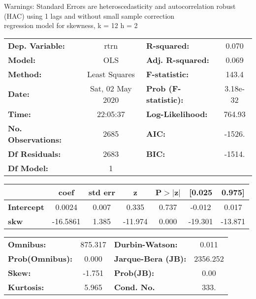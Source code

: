 Warnings: \newline
 [1] Standard Errors are heteroscedasticity and autocorrelation robust (HAC) using 1 lags and without small sample correction\\ 

regression model for skewness, k = 12 h = 2\begin{center}
\begin{tabular}{lclc}
\toprule
\textbf{Dep. Variable:}    &       rtrn       & \textbf{  R-squared:         } &     0.070   \\
\textbf{Model:}            &       OLS        & \textbf{  Adj. R-squared:    } &     0.069   \\
\textbf{Method:}           &  Least Squares   & \textbf{  F-statistic:       } &     143.4   \\
\textbf{Date:}             & Sat, 02 May 2020 & \textbf{  Prob (F-statistic):} &  3.18e-32   \\
\textbf{Time:}             &     22:05:37     & \textbf{  Log-Likelihood:    } &    764.93   \\
\textbf{No. Observations:} &        2685      & \textbf{  AIC:               } &    -1526.   \\
\textbf{Df Residuals:}     &        2683      & \textbf{  BIC:               } &    -1514.   \\
\textbf{Df Model:}         &           1      & \textbf{                     } &             \\
\bottomrule
\end{tabular}
\begin{tabular}{lcccccc}
                   & \textbf{coef} & \textbf{std err} & \textbf{z} & \textbf{P$> |$z$|$} & \textbf{[0.025} & \textbf{0.975]}  \\
\midrule
\textbf{Intercept} &       0.0024  &        0.007     &     0.335  &         0.737        &       -0.012    &        0.017     \\
\textbf{skw}       &     -16.5861  &        1.385     &   -11.974  &         0.000        &      -19.301    &      -13.871     \\
\bottomrule
\end{tabular}
\begin{tabular}{lclc}
\textbf{Omnibus:}       & 875.317 & \textbf{  Durbin-Watson:     } &    0.011  \\
\textbf{Prob(Omnibus):} &   0.000 & \textbf{  Jarque-Bera (JB):  } & 2356.252  \\
\textbf{Skew:}          &  -1.751 & \textbf{  Prob(JB):          } &     0.00  \\
\textbf{Kurtosis:}      &   5.965 & \textbf{  Cond. No.          } &     333.  \\
\bottomrule
\end{tabular}
\end{center}

